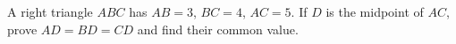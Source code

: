 A right triangle $ ABC $ has $ AB=3 $, $ BC=4 $, $ AC=5 $. If $ D $ is the midpoint of $ AC $, prove $ AD=BD=CD $ and find their common value.
